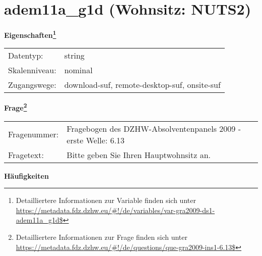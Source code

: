 
    \setcounter{footnote}{0}

    \vspace*{-1.8cm}
	\section{adem11a\_g1d (Wohnsitz: NUTS2)}
	\label{section:adem11a_g1d}



    \vspace*{0.5cm}
    \noindent\textbf{Eigenschaften\footnote{Detailliertere Informationen zur Variable finden sich unter
		\url{https://metadata.fdz.dzhw.eu/\#!/de/variables/var-gra2009-ds1-adem11a_g1d$}}}\\
	\begin{tabularx}{\hsize}{@{}lX}
	Datentyp: & string \\
	Skalenniveau: & nominal \\
	Zugangswege: &
	  download-suf, 
	  remote-desktop-suf, 
	  onsite-suf
 \\
    \end{tabularx}



				\vspace*{0.5cm}
                \noindent\textbf{Frage\footnote{Detailliertere Informationen zur Frage finden sich unter
		              \url{https://metadata.fdz.dzhw.eu/\#!/de/questions/que-gra2009-ins1-6.13$}}}\\
				\begin{tabularx}{\hsize}{@{}lX}
					Fragenummer: &
					  Fragebogen des DZHW-Absolventenpanels 2009 - erste Welle:
					  6.13
 \\
					Fragetext: & Bitte geben Sie Ihren Hauptwohnsitz an. \\
				\end{tabularx}





        		\vspace*{0.5cm}
                \noindent\textbf{Häufigkeiten}

